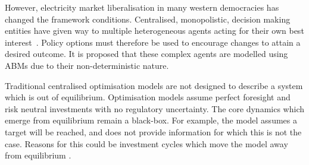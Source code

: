 However, electricity market liberalisation in many western democracies has changed the framework conditions. Centralised, monopolistic, decision making entities have given way to multiple heterogeneous agents acting for their own best interest~\cite{Most2010}. Policy options must therefore be used to encourage changes to attain a desired outcome. It is proposed that these complex agents are modelled using ABMs due to their non-deterministic nature. 



Traditional centralised optimisation models are not designed to  describe a system which is out of equilibrium. Optimisation models assume perfect foresight and risk neutral investments with no regulatory uncertainty. The core dynamics which emerge from equilibrium remain a black-box. For example, the model assumes a target will be reached, and does not provide information for which this is not the case. Reasons for this could be investment cycles which move the model away from equilibrium \cite{Chappin2017}.









